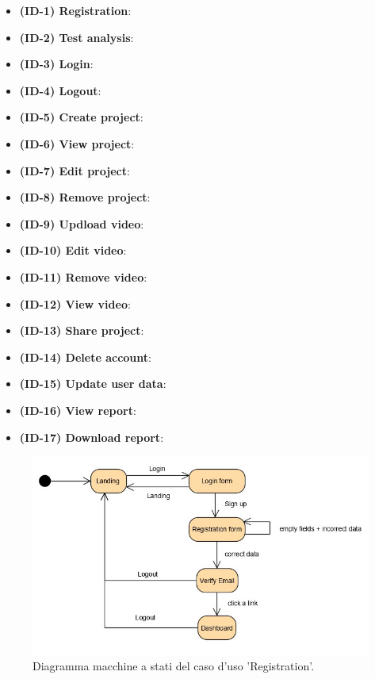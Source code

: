 
\begin{itemize}
	\item \textbf{(ID-1) Registration}:
	\item \textbf{(ID-2) Test analysis}:
	\item \textbf{(ID-3) Login}:
	\item \textbf{(ID-4) Logout}:
	\item \textbf{(ID-5) Create project}:
	\item \textbf{(ID-6) View project}:
	\item \textbf{(ID-7) Edit project}:
	\item \textbf{(ID-8) Remove project}:
	\item \textbf{(ID-9) Updload video}:
	\item \textbf{(ID-10) Edit video}:
	\item \textbf{(ID-11) Remove video}:
	\item \textbf{(ID-12) View video}:
	\item \textbf{(ID-13) Share project}:
	\item \textbf{(ID-14) Delete account}:
	\item \textbf{(ID-15) Update user data}:
	\item \textbf{(ID-16) View report}:
	\item \textbf{(ID-17) Download report}:
	
\end{itemize}

\begin{figure}[H]
	\centering
	\caption{Diagramma macchine a stati del caso d'uso 'Registration'.}
	\label{fig:diagramma-macchine-stati:registration}
	\includegraphics[width=\textwidth]{images/diagramma-macchine-stati/registration}
\end{figure}

